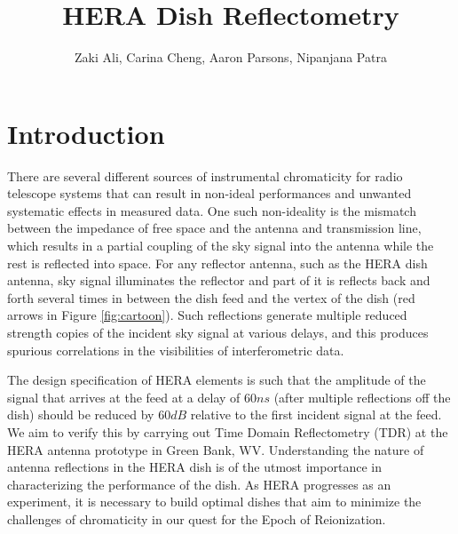 \documentclass[12pt,preprint]{aastex}
\begin{document}
\title{HERA Dish Reflectometry} 
\author{Zaki Ali, Carina Cheng, Aaron Parsons, Nipanjana Patra}
\maketitle

\section{Introduction}

There are several different sources of instrumental chromaticity for radio telescope systems that can result in non-ideal performances and unwanted systematic effects in measured data. One such non-ideality is the mismatch between the impedance of free space and the antenna and transmission line, which results in a partial coupling of the sky signal into the antenna while the rest is reflected into space. For any reflector antenna, such as the HERA dish antenna, sky signal illuminates the reflector and part of it is reflects back and forth several times in between the dish feed and the vertex of the dish (red arrows in Figure \ref{fig:cartoon}). Such reflections generate multiple reduced strength copies of the incident sky signal at various delays, and this produces spurious correlations in the visibilities of interferometric data. 

The design specification of HERA elements is such that the amplitude of the signal that arrives at the feed at a delay of $60ns$ (after multiple reflections off the dish) should be reduced by $60dB$ relative to the first incident signal at the feed. We aim to verify this by carrying out Time Domain Reflectometry (TDR) at the HERA antenna prototype in Green Bank, WV. Understanding the nature of antenna reflections in the HERA dish is of the utmost importance in characterizing the performance of the dish. As HERA progresses as an experiment, it is necessary to build optimal dishes that aim to minimize the challenges of chromaticity in our quest for the Epoch of Reionization.
\end{document}
